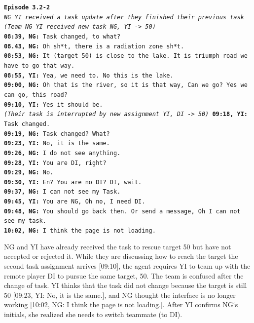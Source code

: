 \noindent\texttt{\textbf{Episode 3.2-2}\\
\emph{NG YI received a task update after they finished their previous task}\\
\emph{(Team NG YI received new task NG, YI -> 50)}\\
\textbf{08:39, NG: } Task changed, to what? \\
\textbf{08.43, NG: } Oh sh*t, there is a radiation zone sh*t. \\
\textbf{08:53, NG: } It (target 50) is close to the lake. It is triumph road we have to go that way. \\
\textbf{08:55, YI: } Yea, we need to. No this is the lake. \\
\textbf{09:00, NG: } Oh that is the river, so it is that way, Can we go? Yes we can go, this road?\\
\textbf{09:10, YI: } Yes it should be. \\
\emph{(Their task is interrupted by new assignment YI, DI -> 50)}
\textbf{09:18, YI: } Task changed.\\
\textbf{09:19, NG: } Task changed? What? \\
\textbf{09:23, YI: } No, it is the same.  \\
\textbf{09:26, NG: } I do not see anything. \\
\textbf{09:28, YI: } You are DI, right?\\
\textbf{09:29, NG: } No.\\
\textbf{09:30, YI: } En? You are no DI? DI, wait. \\
\textbf{09:37, NG: } I can not see my Task.\\
\textbf{09:45, YI: } You are NG, Oh no, I need DI.  \\
\textbf{09:48, NG: } You should go back then. Or send a message, Oh I can not see my task.\\
\textbf{10:02, NG: } I think the page is not loading.\\
}
 
NG and YI have already received the task to rescue target 50 but have not accepted or rejected it. While they are discussing how to reach the target the second task assignment arrives [09:10], the agent requires YI to team up with the remote player DI to pursue the same target, 50. The team is confused after the change of task. YI thinks that the task did not change because the target is still 50 [09:23, YI: No, it is the same.], and NG thought the interface is no longer working [10:02, NG: I think the page is not loading.]. After YI confirms NG`s initials, she realized she needs to switch teammate (to DI). \\

